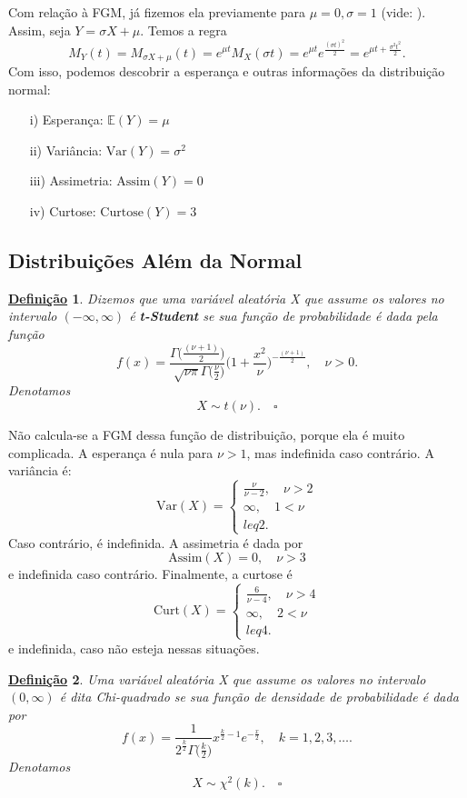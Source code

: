 \documentclass{article}
\newtheorem*{def*}{\underline{Defini\c c\~ao}}
\begin{document}
Com relação à FGM, já fizemos ela previamente para \(\mu = 0, \sigma =1\) (vide: ). Assim, seja \(Y = \sigma X + \mu.\)
Temos a regra 
\[
  M_{Y}(t) = M_{\sigma X + \mu }(t) = e^{\mu t}M_{X}(\sigma t) = e^{\mu t}e^{\frac{(\sigma t)^{2}}{2}} = e^{\mu t + \frac{\sigma^{2}t^{2}}{2}}.
\]
Com isso, podemos descobrir a esperança e outras informações da distribuição normal:
\begin{itemize}
  \item[i)] Esperança: \(\mathbb{E}(Y) = \mu \)
  \item[ii)] Variância: \(\mathrm{Var}(Y) = \sigma ^{2}\)
  \item[iii)] Assimetria: \(\mathrm{Assim}(Y) = 0\)
  \item[iv)] Curtose: \(\mathrm{Curtose}(Y) = 3\)
\end{itemize}
\subsection{Distribuições Além da Normal}
\begin{def*}
  Dizemos que uma variável aleatória X que assume os valores no intervalo \((-\infty, \infty)\) é \textbf{t-Student} se sua função de probabilidade é dada pela função 
  \[
    f(x) = \frac{\Gamma \biggl(\frac{(\nu+1)}{2}\biggr)}{\sqrt[]{\nu\pi }\Gamma \biggl(\frac{\nu}{2}\biggr)}\biggl(1 + \frac{x^{2}}{\nu}\biggr)^{-\frac{(\nu+1)}{2}}, \quad \nu > 0.
  \] 
  Denotamos 
  \[
    X\sim t(\nu ). \quad \square
  \]
\end{def*}
Não calcula-se a FGM dessa função de distribuição, porque ela é muito complicada. A esperança é nula para \(\nu > 1\),
mas indefinida caso contrário. A variância é:
\[
  \mathrm{Var}(X) = \left\{\begin{array}{ll}
      \frac{\nu}{\nu - 2},\quad \nu > 2\\
      \infty,\quad 1 < \nu \\leq 2.
  \end{array}\right.
\]
Caso contrário, é indefinida. A assimetria é dada por 
\[
  \mathrm{Assim}(X) = 0,\quad \nu > 3
\]
e indefinida caso contrário. Finalmente, a curtose é 
\[
  \mathrm{Curt}(X) = \left\{\begin{array}{ll}
      \frac{6}{\nu-4},\quad \nu > 4\\
      \infty,\quad 2 < \nu \\leq 4.
  \end{array}\right.
\]
e indefinida, caso não esteja nessas situações.
\begin{def*}
  Uma variável aleatória X que assume os valores no intervalo \((0, \infty)\) é dita \textit{Chi-quadrado} se sua função de densidade de probabilidade é dada por 
  \[
    f(x) = \frac{1}{2^{\frac{k}{2}}\Gamma \biggl(\frac{k}{2}\biggr)}x^{\frac{k}{2}-1}e^{-\frac{x}{2}},\quad k = 1, 2, 3, \dotsc.
  \]
  Denotamos 
  \[
    X\sim \chi^{2}(k). \quad \square
  \]
\end{def*}
\end{document}
